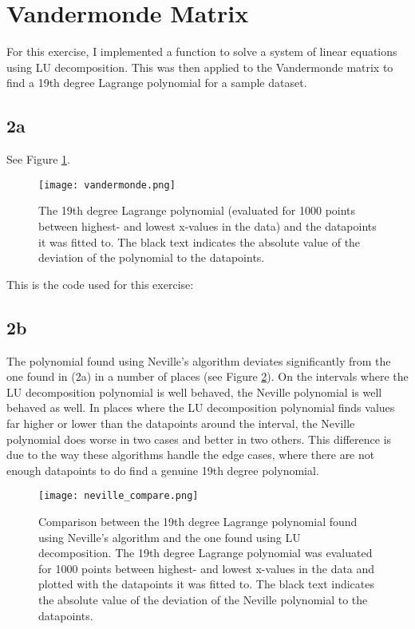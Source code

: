 \section{Vandermonde Matrix}
For this exercise, I implemented a function to solve a system of linear equations
using LU decomposition. This was then applied to the Vandermonde matrix to
find a 19th degree Lagrange polynomial for a sample dataset.

\subsection*{2a}
See Figure \ref{fig:vandermonde}.
\begin{figure}
    \centering
    \texttt{[image: vandermonde.png]}
    \caption{The 19th degree Lagrange polynomial (evaluated for 1000 points 
    between highest- and lowest x-values in the data) and the datapoints it 
    was fitted to. The black text indicates the absolute value of the 
    deviation of the polynomial to the datapoints.}
    \label{fig:vandermonde}
\end{figure}

This is the code used for this exercise:


\subsection*{2b}
The polynomial found using Neville's algorithm deviates significantly
from the one found in (2a) in a number of places (see Figure \ref{fig:neville}). 
On the intervals where the LU decomposition polynomial is well behaved, the 
Neville polynomial is well behaved as well. In places where the LU 
decomposition polynomial finds values far higher or lower than the 
datapoints around the interval, the Neville polynomial does worse in two 
cases and better in two others. This difference is due to the way these 
algorithms handle the edge cases, where there are not enough datapoints to 
do find a genuine 19th degree polynomial.

\begin{figure}
    \centering
    \texttt{[image: neville\_compare.png]}
    \caption{Comparison between the 19th degree Lagrange polynomial found
    using Neville's algorithm and the one found using LU decomposition. The 
    19th degree Lagrange polynomial was evaluated for 1000 points between 
    highest- and lowest x-values in the data and plotted with the datapoints 
    it was fitted to. The black text indicates the absolute value of the 
    deviation of the Neville polynomial to the datapoints.}
    \label{fig:neville}
\end{figure}

